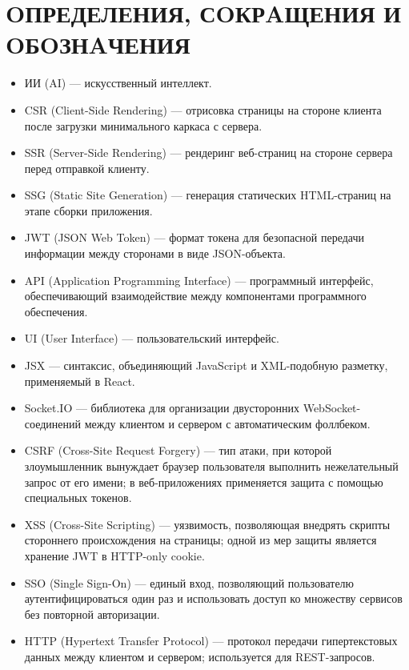 \newpage
{}
\section*{OПРЕДЕЛЕНИЯ, СOКРAЩЕНИЯ И OБOЗНAЧЕНИЯ}
\setcounter{page}{4}

\begin{itemize}
  \item ИИ (AI) — искусственный интеллект.
  \item CSR (Client-Side Rendering) — отрисовка страницы на стороне клиента после загрузки минимального каркаса с сервера.
  \item SSR (Server-Side Rendering) — рендеринг веб-страниц на стороне сервера перед отправкой клиенту.
  \item SSG (Static Site Generation) — генерация статических HTML-страниц на этапе сборки приложения.
  \item JWT (JSON Web Token) — формат токена для безопасной передачи информации между сторонами в виде JSON-объекта.
  \item API (Application Programming Interface) — программный интерфейс, обеспечивающий взаимодействие между компонентами программного обеспечения.
  \item UI (User Interface) — пользовательский интерфейс.
  \item JSX — синтаксис, объединяющий JavaScript и XML-подобную разметку, применяемый в React.
  \item Socket.IO — библиотека для организации двусторонних WebSocket-соединений между клиентом и сервером с автоматическим фоллбеком.
  \item CSRF (Cross-Site Request Forgery) — тип атаки, при которой злоумышленник вынуждает браузер пользователя выполнить нежелательный запрос от его имени; в веб-приложениях применяется защита с помощью специальных токенов.
  \item XSS (Cross-Site Scripting) — уязвимость, позволяющая внедрять скрипты стороннего происхождения на страницы; одной из мер защиты является хранение JWT в HTTP-only cookie.
  \item SSO (Single Sign-On) — единый вход, позволяющий пользователю аутентифицироваться один раз и использовать доступ ко множеству сервисов без повторной авторизации.
  \item HTTP (Hypertext Transfer Protocol) — протокол передачи гипертекстовых данных между клиентом и сервером; используется для REST-запросов.

\end{itemize}
